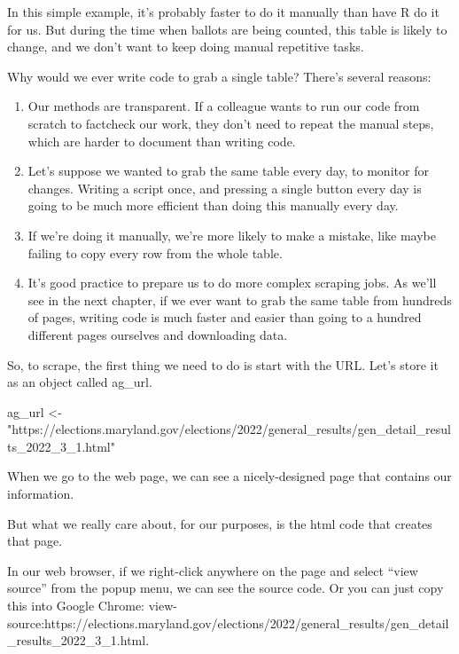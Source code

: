 \documentclass[
  letterpaper,
  DIV=11,
  numbers=noendperiod]{scrreprt}
\newenvironment{Shaded}{\begin{snugshade}}{\end{snugshade}}
\newcommand{\NormalTok}[1]{\textcolor[rgb]{0.00,0.23,0.31}{#1}}
\newcommand{\OtherTok}[1]{\textcolor[rgb]{0.00,0.23,0.31}{#1}}
\newcommand{\StringTok}[1]{\textcolor[rgb]{0.13,0.47,0.30}{#1}}
\providecommand{\tightlist}{%
  \setlength{\itemsep}{0pt}\setlength{\parskip}{0pt}}\usepackage{longtable,booktabs,array}
\begin{document}
In this simple example, it's probably faster to do it manually than have
R do it for us. But during the time when ballots are being counted, this
table is likely to change, and we don't want to keep doing manual
repetitive tasks.

Why would we ever write code to grab a single table? There's several
reasons:

\begin{enumerate}
\def\labelenumi{\arabic{enumi}.}
\tightlist
\item
  Our methods are transparent. If a colleague wants to run our code from
  scratch to factcheck our work, they don't need to repeat the manual
  steps, which are harder to document than writing code.
\item
  Let's suppose we wanted to grab the same table every day, to monitor
  for changes. Writing a script once, and pressing a single button every
  day is going to be much more efficient than doing this manually every
  day.
\item
  If we're doing it manually, we're more likely to make a mistake, like
  maybe failing to copy every row from the whole table.
\item
  It's good practice to prepare us to do more complex scraping jobs. As
  we'll see in the next chapter, if we ever want to grab the same table
  from hundreds of pages, writing code is much faster and easier than
  going to a hundred different pages ourselves and downloading data.
\end{enumerate}

So, to scrape, the first thing we need to do is start with the URL.
Let's store it as an object called ag\_url.

\begin{Shaded}
\begin{Highlighting}[]
\NormalTok{ag\_url }\OtherTok{\textless{}{-}} \StringTok{"https://elections.maryland.gov/elections/2022/general\_results/gen\_detail\_results\_2022\_3\_1.html"}
\end{Highlighting}
\end{Shaded}

When we go to the web page, we can see a nicely-designed page that
contains our information.

But what we really care about, for our purposes, is the html code that
creates that page.

In our web browser, if we right-click anywhere on the page and select
``view source'' from the popup menu, we can see the source code. Or you
can just copy this into Google Chrome:
view-source:https://elections.maryland.gov/elections/2022/general\_results/gen\_detail\_results\_2022\_3\_1.html.
\end{document}
